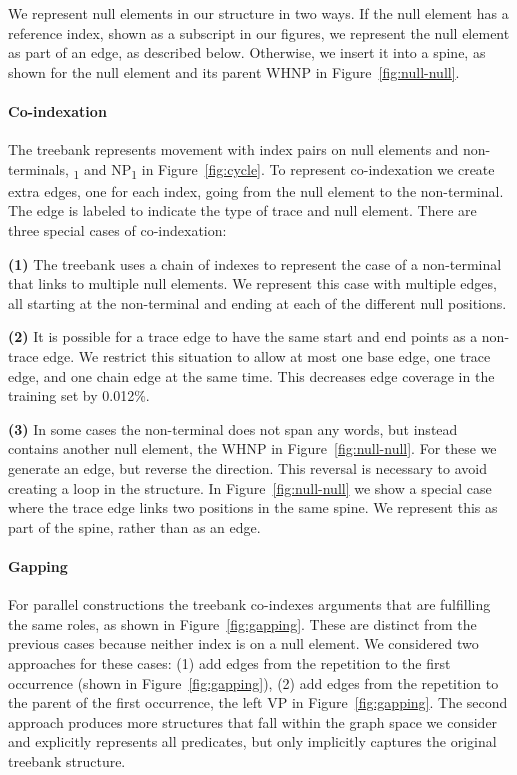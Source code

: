 We represent null elements in our structure in two ways.
If the null element has a reference index, shown as a subscript in our figures, we represent the null element as part of an edge, as described below.
Otherwise, we insert it into a spine, as shown for the null element and its parent WHNP in Figure~\ref{fig:null-null}.

\paragraph{Co-indexation}
The treebank represents movement with index pairs on null elements and non-terminals, \myeg *\textsubscript{1} and NP\textsubscript{1} in Figure~\ref{fig:cycle}.
To represent co-indexation we create extra edges, one for each index, going from the null element to the non-terminal.
The edge is labeled to indicate the type of trace and null element.
There are three special cases of co-indexation:

\textbf{(1)}
The treebank uses a chain of indexes to represent the case of a non-terminal that links to multiple null elements.
We represent this case with multiple edges, all starting at the non-terminal and ending at each of the different null positions.

\textbf{(2)}
It is possible for a trace edge to have the same start and end points as a non-trace edge.
We restrict this situation to allow at most one base edge, one trace edge, and one chain edge at the same time.
This decreases edge coverage in the training set by 0.012\%.

\textbf{(3)}
In some cases the non-terminal does not span any words, but instead contains another null element, \myeg the WHNP in Figure~\ref{fig:null-null}.
For these we generate an edge, but reverse the direction.
This reversal is necessary to avoid creating a loop in the structure.
In Figure~\ref{fig:null-null} we show a special case where the trace edge links two positions in the same spine.
We represent this as part of the spine, rather than as an edge.

\paragraph{Gapping}
For parallel constructions the treebank co-indexes arguments that are fulfilling the same roles, as shown in Figure~\ref{fig:gapping}.
These are distinct from the previous cases because neither index is on a null element.
We considered two approaches for these cases: (1) add edges from the repetition to the first occurrence (shown in Figure~\ref{fig:gapping}), (2) add edges from the repetition to the parent of the first occurrence, \myeg the left VP in Figure~\ref{fig:gapping}.
The second approach produces more structures that fall within the graph space we consider and explicitly represents all predicates, but only implicitly captures the original treebank structure.

